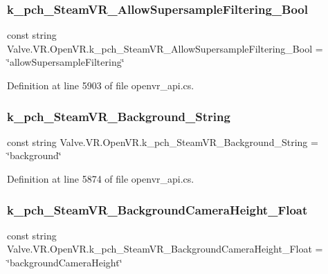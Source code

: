 \subsubsection{\texorpdfstring{k\_pch\_SteamVR\_AllowSupersampleFiltering\_Bool}{k\_pch\_SteamVR\_AllowSupersampleFiltering\_Bool}}
{\footnotesize\ttfamily const string Valve.\+V\+R.\+Open\+V\+R.\+k\+\_\+pch\+\_\+\+Steam\+V\+R\+\_\+\+Allow\+Supersample\+Filtering\+\_\+\+Bool = \char`\"{}allow\+Supersample\+Filtering\char`\"{}}



Definition at line 5903 of file openvr\+\_\+api.\+cs.

\mbox{\label{class_valve_1_1_v_r_1_1_open_v_r_ac476335471ab953320c4975e76f6ca45}} 
\subsubsection{\texorpdfstring{k\_pch\_SteamVR\_Background\_String}{k\_pch\_SteamVR\_Background\_String}}
{\footnotesize\ttfamily const string Valve.\+V\+R.\+Open\+V\+R.\+k\+\_\+pch\+\_\+\+Steam\+V\+R\+\_\+\+Background\+\_\+\+String = \char`\"{}background\char`\"{}}



Definition at line 5874 of file openvr\+\_\+api.\+cs.

\mbox{\label{class_valve_1_1_v_r_1_1_open_v_r_a55c19346d64bab0aec92ed61ed8e7a4b}} 
\subsubsection{\texorpdfstring{k\_pch\_SteamVR\_BackgroundCameraHeight\_Float}{k\_pch\_SteamVR\_BackgroundCameraHeight\_Float}}
{\footnotesize\ttfamily const string Valve.\+V\+R.\+Open\+V\+R.\+k\+\_\+pch\+\_\+\+Steam\+V\+R\+\_\+\+Background\+Camera\+Height\+\_\+\+Float = \char`\"{}background\+Camera\+Height\char`\"{}}



